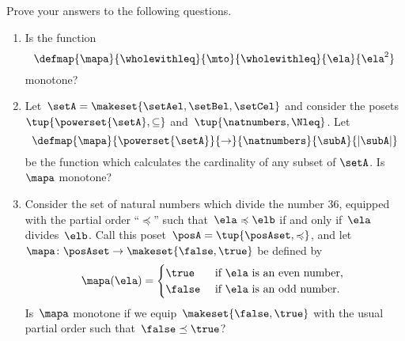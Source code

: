 \clearpage
\vfill
\begin{gradedexercise}
    \label{ex:MonotoneMapCheck}

    Prove your answers to the following questions.
    \begin{enumerate}
        \item Is the function
              \begin{equation*}
                  \defmap{\mapa}{\wholewithleq}{\mto}{\wholewithleq}{\ela}{\ela^2}
              \end{equation*}
              monotone?
        \item Let~$\setA = \makeset{\setAel, \setBel, \setCel}$ and consider the posets~$\tup{\powerset{\setA}, \mathrel{\subseteq}}$ and~$\tup{\natnumbers, \Nleq}$.
              Let
              \begin{equation*}
                  \defmap{\mapa}{\powerset{\setA}}{\to}{\natnumbers}{\subA}{\vert \subA \vert}
              \end{equation*}
              be the function which calculates the cardinality of any subset of $\setA$.
              Is $\mapa$ monotone?
        \item Consider the set of natural numbers which divide the number 36, equipped with the partial order ``$\preccurlyeq$'' such that~$\ela \preccurlyeq \elb$ if and only if~$\ela$ divides~$\elb$.
              Call this poset~$\posA = \tup{\posAset, \preccurlyeq}$, and let~$\mapa \colon \posAset \to \makeset{\false, \true}$ be defined by
              \begin{equation}
                  \mapa(\ela) =
                  \begin{cases}
                      \true  & \text{ if } \ela \text{ is an even number, } \\
                      \false & \text{ if } \ela \text{ is an odd number.
                      }
                  \end{cases}
              \end{equation}
              Is~$\mapa$ monotone if we equip~$\makeset{\false, \true}$ with the usual partial order such that~$\false \preceq \true$?
    \end{enumerate}
\end{gradedexercise}


